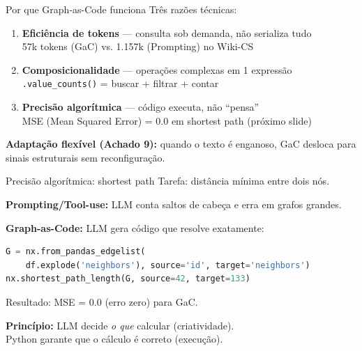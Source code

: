 \documentclass{beamer}
\begin{document}

\begin{frame}{Por que Graph-as-Code funciona}
  Três razões técnicas:

  \vspace{0.3em}
  \begin{enumerate}
    \item \textbf{Eficiência de tokens} --- consulta sob demanda, não serializa tudo\\
      {\footnotesize 57k tokens (GaC) vs. 1.157k (Prompting) no Wiki-CS}

    \vspace{0.3em}
    \item \textbf{Composicionalidade} --- operações complexas em 1 expressão\\
      {\footnotesize \texttt{.value\_counts()} = buscar + filtrar + contar}

    \vspace{0.3em}
    \item \textbf{Precisão algorítmica} --- código executa, não ``pensa''\\
      {\footnotesize MSE (Mean Squared Error) = 0.0 em shortest path (próximo slide)}
  \end{enumerate}

  \vspace{0.5em}
  \textbf{Adaptação flexível (Achado 9):} quando o texto é enganoso, GaC desloca para sinais estruturais sem reconfiguração.
\end{frame}

\begin{frame}[fragile]{Precisão algorítmica: shortest path}
  Tarefa: distância mínima entre dois nós.

  \vspace{0.3em}
  \textbf{Prompting/Tool-use:} LLM conta saltos de cabeça e erra em grafos grandes.

  \vspace{0.2em}
  \textbf{Graph-as-Code:} LLM gera código que resolve exatamente:
  \begin{lstlisting}[language=Python, basicstyle=\ttfamily\scriptsize]
G = nx.from_pandas_edgelist(
    df.explode('neighbors'), source='id', target='neighbors')
nx.shortest_path_length(G, source=42, target=133)
  \end{lstlisting}

  \vspace{0.3em}
  Resultado: MSE = 0.0 (erro zero) para GaC.

  \vspace{0.3em}
  \textbf{Princípio:} LLM decide \emph{o que} calcular (criatividade).\\
  Python garante que o cálculo é correto (execução).
\end{frame}
\end{document}
